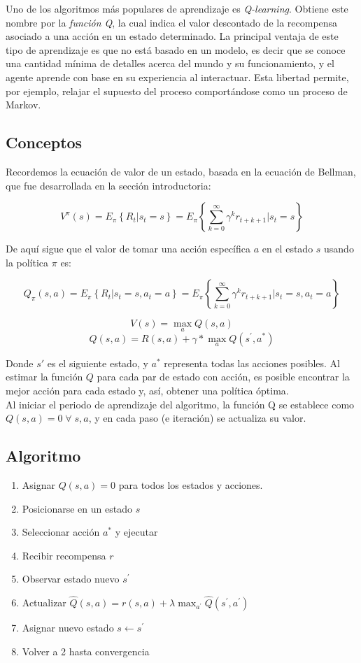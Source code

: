 Uno de los algoritmos m\'as populares de aprendizaje es \textit{Q-learning}. Obtiene este nombre por la \textit{funci\'on Q}, la cual indica el valor descontado de la recompensa asociado a una acci\'on en un estado determinado. La principal ventaja de este tipo de aprendizaje es que no est\'a basado en un modelo, es decir que se conoce una cantidad m\'inima de detalles acerca del mundo y su funcionamiento, y el agente aprende con base en su experiencia al interactuar. Esta libertad permite, por ejemplo, relajar el supuesto del proceso comport\'andose como un proceso de Markov.

\subsection{Conceptos}

Recordemos la ecuaci\'on de valor de un estado, basada en la ecuaci\'on de Bellman, que fue desarrollada en la secci\'on introductoria:

$$
V^{\pi}(s) = E_{\pi}\left\{R_{t}|s_{t} = s\right\} = E_{\pi}\left\{\sum_{k=0}^{\infty}\gamma^{k}r_{t+k+1}|s_{t}=s\right\}
$$

De aqu\'i sigue que el valor de tomar una acci\'on espec\'ifica $a$ en el estado $s$ usando la pol\'itica $\pi$ es:

$$
    Q_{\pi}(s,a) = E_{\pi}\left\{R_{t}|s_{t}=s,a_{t}=a\right\}=E_{\pi}\left \{\sum_{k = 0}^{\infty}\gamma^{k}r_{t+k+1}|s_{t} =s, a_{t} =a  \right \}
$$

$$
V(s) = \max_{a}{Q(s,a)}
$$
$$
Q(s, a) = R(s, a) + \gamma * \max_{a}{Q(s^{'}, a^{*})}
$$

Donde $s{'}$ es el siguiente estado, y $a^{*}$ representa todas las acciones posibles. Al estimar la funci\'on $Q$ para cada par de estado con acci\'on, es posible encontrar la mejor acci\'on para cada estado y, as\'i, obtener una pol\'itica \'optima.\\

Al iniciar el periodo de aprendizaje del algoritmo, la funci\'on Q se establece como $Q(s,a) = 0 \; \forall \; s, a$, y en cada paso (e iteraci\'on) se actualiza su valor.

\subsection{Algoritmo}

\begin{enumerate}
    \item Asignar $Q(s,a) = 0$ para todos los estados y acciones.
    \item Posicionarse en un estado $s$
    \item Seleccionar acci\'on $a^{*}$ y ejecutar
    \item Recibir recompensa $r$
    \item Observar estado nuevo $s^{'}$
    \item Actualizar $\hat{Q}(s,a) = r(s,a) + \lambda \max _{ a^{'} }{  \hat{Q}(s^{'},a^{'}) }$
    \item Asignar nuevo estado $s \leftarrow s^{'}$
    \item Volver a 2 hasta convergencia
\end{enumerate}

